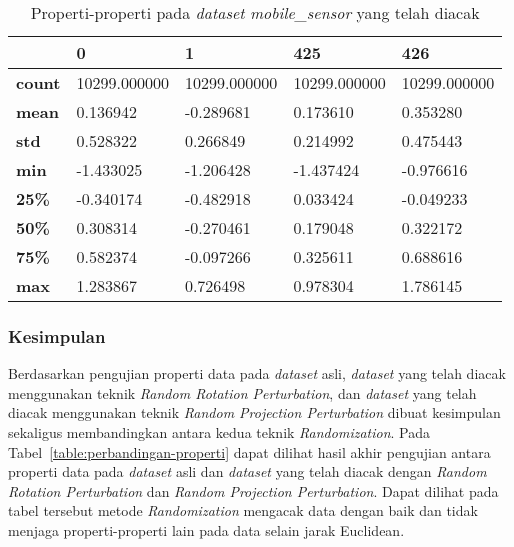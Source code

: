 \begin{table}
	\centering
	\caption{Properti-properti pada \textit{dataset} \textit{mobile\_sensor} yang telah diacak}
	\begin{tabular}{l|llll}
		\hline
		& 0 & 1 & 425 & 426 \\ \hline
		\textbf{count} & 10299.000000 & 10299.000000 & 10299.000000 & 10299.000000 \\
		\textbf{mean} & 0.136942 & -0.289681 & 0.173610 & 0.353280 \\
		\textbf{std} & 0.528322 & 0.266849 & 0.214992 & 0.475443 \\
		\textbf{min} & -1.433025 & -1.206428 & -1.437424 & -0.976616 \\
		\textbf{25\%} & -0.340174 & -0.482918 & 0.033424 & -0.049233 \\
		\textbf{50\%} & 0.308314 & -0.270461 & 0.179048 & 0.322172 \\
		\textbf{75\%} & 0.582374 & -0.097266 & 0.325611 & 0.688616 \\
		\textbf{max} & 1.283867 & 0.726498 & 0.978304 & 1.786145 \\
		\hline
	\end{tabular}
	\label{table:properti-mobile-sensor-randomisasi}
\end{table}

\subsubsection{Kesimpulan}
\label{subsubsec:pengujian-properti-kesimpulan}

Berdasarkan pengujian properti data pada \textit{dataset} asli, \textit{dataset} yang telah diacak menggunakan teknik \textit{Random Rotation Perturbation}, dan \textit{dataset} yang telah diacak menggunakan teknik \textit{Random Projection Perturbation} dibuat kesimpulan sekaligus membandingkan antara kedua teknik \textit{Randomization}. Pada Tabel~\ref{table:perbandingan-properti} dapat dilihat hasil akhir pengujian antara properti data pada \textit{dataset} asli dan \textit{dataset} yang telah diacak dengan \textit{Random Rotation Perturbation} dan \textit{Random Projection Perturbation}. Dapat dilihat pada tabel tersebut metode \textit{Randomization} mengacak data dengan baik dan tidak menjaga properti-properti lain pada data selain jarak Euclidean.

